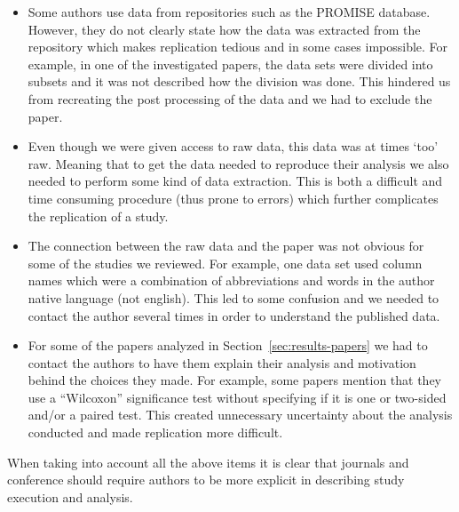 \begin{itemize}


\item Some authors use data from repositories such as the PROMISE database. However, they do not clearly state how the data was extracted from the repository which makes replication tedious and in some cases impossible. For example, in one of the investigated papers, the data sets were divided into subsets and it was not described how the division was done. This hindered us from recreating the post processing of the data and we had to exclude the paper.  


\item Even though we were given access to raw data, this data was at times `too' raw. Meaning that to get the data needed to reproduce their analysis we also needed to perform some kind of data extraction. This is both a difficult and time consuming procedure (thus prone to errors) which further complicates the replication of a study.


\item The connection between the raw data and the paper was not obvious for some of the studies we reviewed. For example, one data set used column names which were a combination of abbreviations and words in the author native language (not english). This led to some confusion and we needed to contact the author several times in order to understand the published data.


\item For some of the papers analyzed in Section~\ref{sec:results-papers} we had to contact the authors to have them explain their analysis and motivation behind the choices they made. For example, some papers mention that they use a ``Wilcoxon'' significance test without specifying if it is one or two-sided and\slash or a paired test. This created unnecessary uncertainty about the analysis conducted and made replication more difficult.


\end{itemize}


When taking into account all the above items it is clear that journals and conference should require authors to be more explicit in describing study execution and analysis.




